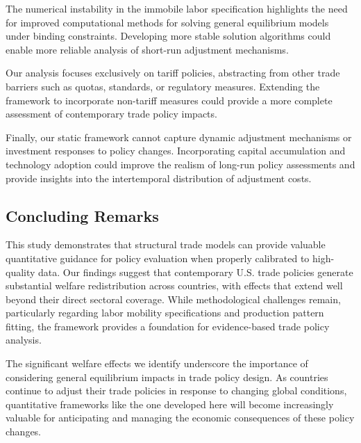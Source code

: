 The numerical instability in the immobile labor specification highlights the need for improved computational methods for solving general equilibrium models under binding constraints. Developing more stable solution algorithms could enable more reliable analysis of short-run adjustment mechanisms.

Our analysis focuses exclusively on tariff policies, abstracting from other trade barriers such as quotas, standards, or regulatory measures. Extending the framework to incorporate non-tariff measures could provide a more complete assessment of contemporary trade policy impacts.

Finally, our static framework cannot capture dynamic adjustment mechanisms or investment responses to policy changes. Incorporating capital accumulation and technology adoption could improve the realism of long-run policy assessments and provide insights into the intertemporal distribution of adjustment costs.

\subsection{Concluding Remarks}

This study demonstrates that structural trade models can provide valuable quantitative guidance for policy evaluation when properly calibrated to high-quality data. Our findings suggest that contemporary U.S. trade policies generate substantial welfare redistribution across countries, with effects that extend well beyond their direct sectoral coverage. While methodological challenges remain, particularly regarding labor mobility specifications and production pattern fitting, the framework provides a foundation for evidence-based trade policy analysis.

The significant welfare effects we identify underscore the importance of considering general equilibrium impacts in trade policy design. As countries continue to adjust their trade policies in response to changing global conditions, quantitative frameworks like the one developed here will become increasingly valuable for anticipating and managing the economic consequences of these policy changes.
